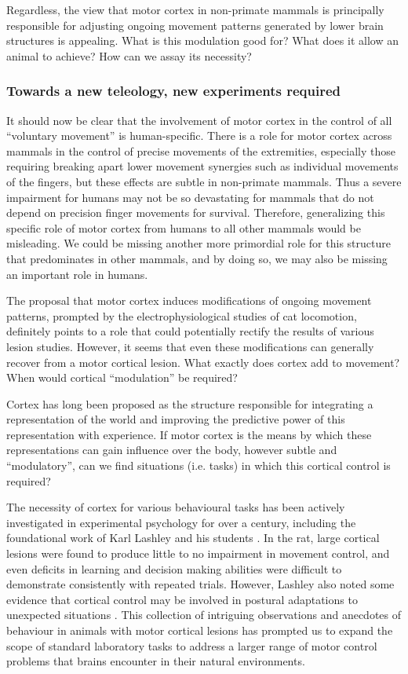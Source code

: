 Regardless, the view that motor cortex in non-primate mammals is principally responsible for adjusting ongoing movement patterns generated by lower brain structures is appealing. What is this modulation good for? What does it allow an animal to achieve? How can we assay its necessity?

\subsubsection*{Towards a new teleology, new experiments required}

It should now be clear that the involvement of motor cortex in the control of all ``voluntary movement'' is human-specific. There is a role for motor cortex across mammals in the control of precise movements of the extremities, especially those requiring breaking apart lower movement synergies such as individual movements of the fingers, but these effects are subtle in non-primate mammals. Thus a severe impairment for humans may not be so devastating for mammals that do not depend on precision finger movements for survival. Therefore, generalizing this specific role of motor cortex from humans to all other mammals would be misleading. We could be missing another more primordial role for this structure that predominates in other mammals, and by doing so, we may also be missing an important role in humans.

The proposal that motor cortex induces modifications of ongoing movement patterns, prompted by the electrophysiological studies of cat locomotion, definitely points to a role that could potentially rectify the results of various lesion studies. However, it seems that even these modifications can generally recover from a motor cortical lesion. What exactly does cortex add to movement? When would cortical ``modulation'' be required?

Cortex has long been proposed as the structure responsible for integrating a representation of the world and improving the predictive power of this representation with experience. If motor cortex is the means by which these representations can gain influence over the body, however subtle and ``modulatory'', can we find situations (i.e. tasks) in which this cortical control is required?

The necessity of cortex for various behavioural tasks has been actively investigated in experimental psychology for over a century, including the foundational work of Karl Lashley and his students \cite{Lashley1950a}. In the rat, large cortical lesions were found to produce little to no impairment in movement control, and even deficits in learning and decision making abilities were difficult to demonstrate consistently with repeated trials. However, Lashley also noted some evidence that cortical control may be involved in postural adaptations to unexpected situations \cite{Lashley1921a}. This collection of intriguing observations and anecdotes of behaviour in animals with motor cortical lesions has prompted us to expand the scope of standard laboratory tasks to address a larger range of motor control problems that brains encounter in their natural environments.

